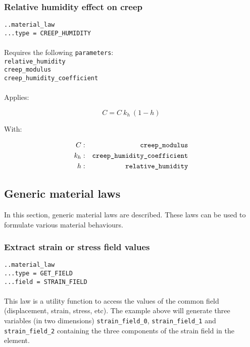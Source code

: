 \documentclass[10pt]{article}
\begin{document}
\subsubsection{Relative humidity effect on creep}

\noindent \verb+..material_law+\\
\verb+...type = CREEP_HUMIDITY+

\paragraph{}Requires the following \verb+parameters+:\\

\noindent \verb+relative_humidity+\\
\verb+creep_modulus+\\
\verb+creep_humidity_coefficient+

\paragraph{}Applies:

\begin{equation}
	C = C\ k_h\ (1-h)
\end{equation}

With:

\begin{eqnarray}
	C & : & \verb+creep_modulus+ \notag \\
	k_h & : & \verb+creep_humidity_coefficient+\notag  \\
	h & : & \verb+relative_humidity+ \notag 
\end{eqnarray}

\subsection{Generic material laws}

In this section, generic material laws are described. These laws can be used to formulate various material behaviours.

\subsubsection{Extract strain or stress field values}

\noindent \verb+..material_law+\\
\verb+...type = GET_FIELD+\\
\verb+...field = STRAIN_FIELD+

\paragraph{}This law is a utility function to access the values of the common field (displacement, strain, stress, etc). The example above will generate three variables (in two dimensions) \verb+strain_field_0+, \verb+strain_field_1+ and \verb+strain_field_2+ containing the three components of the strain field in the element.
\end{document}
